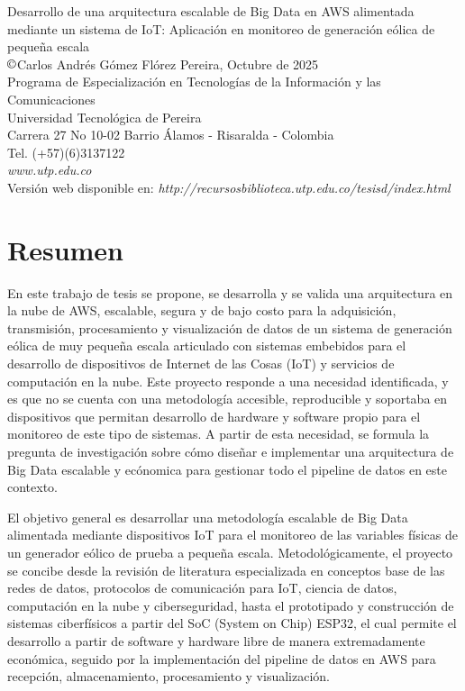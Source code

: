 \documentclass[letterpaper,12pt, oneside]{book}
\def\author{Carlos Andrés Gómez Flórez}
\def\titleproyect{Desarrollo de una arquitectura escalable de Big Data en AWS alimentada mediante un sistema de IoT: Aplicación en monitoreo de generación eólica de pequeña escala}
\def\date{Octubre de 2025}
\begin{document}
\newpage
\thispagestyle{empty}
\small
\noindent\titleproyect\\
$	\copyright$\author
\vfill
\noindent Pereira, \date \\
Programa de Especializaci\'on en Tecnolog\'ias de la Informaci\'on y las Comunicaciones\\
Universidad Tecnol\'ogica de Pereira \\
Carrera 27 No 10-02 Barrio Álamos - Risaralda - Colombia \\
Tel. (+57)(6)3137122 \\
\textit{www.utp.edu.co}\\
Versi\'on web disponible en: \textit{http://recursosbiblioteca.utp.edu.co/tesisd/index.html}
\normalsize





\newpage
\thispagestyle{empty}
\mbox{}



\chapter*{Resumen}

En este trabajo de tesis se propone, se desarrolla y se valida una arquitectura en la nube de AWS, escalable, segura y de bajo costo para la adquisición, transmisión, procesamiento y visualización de datos de un sistema de generación eólica de muy pequeña escala articulado con sistemas embebidos para el desarrollo de dispositivos de Internet de las Cosas (IoT) y servicios de computación en la nube. Este proyecto responde a una necesidad identificada, y es que no se cuenta con una metodología accesible, reproducible y soportaba en dispositivos que permitan desarrollo de hardware y software propio para el monitoreo de este tipo de sistemas. A partir de esta necesidad, se formula la pregunta de investigación sobre cómo diseñar e implementar una arquitectura de Big Data escalable y ecónomica para gestionar todo el pipeline de datos en este contexto. 

El objetivo general es desarrollar una metodología escalable de Big Data alimentada mediante dispositivos IoT para el monitoreo de las variables físicas de un generador eólico de prueba a pequeña escala. Metodológicamente, el proyecto se concibe desde la revisión de literatura especializada en conceptos base de las redes de datos, protocolos de comunicación para IoT, ciencia de datos, computación en la nube y ciberseguridad, hasta el prototipado y construcción de sistemas ciberfísicos a partir del SoC (System on Chip) ESP32, el cual permite el desarrollo a partir de software y hardware libre de manera extremadamente económica, seguido por la implementación del pipeline de datos en AWS para recepción, almacenamiento, procesamiento y visualización. 
\end{document}
